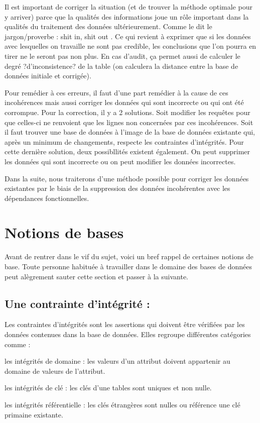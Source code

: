 \documentclass[12pt, a4paper, oneside, titlepage]{book}%
\begin{document}
Il est important de corriger la situation (et de trouver la méthode optimale pour y arriver) parce que la qualités des informations joue un rôle important dans la qualités du traitement des données ultérieurement. Comme le dit le jargon/proverbe : \og shit in, shit out \fg. Ce qui revient à exprimer que si les données avec lesquelles on travaille ne sont pas credible, les conclusions que l'on pourra en tirer ne le seront pas non plus. En cas d'audit, ça permet aussi de calculer le degré ?d'inconsistence? de la table (on calculera la distance entre la base de données initiale et corrigée). 

Pour remédier à ces erreurs, il faut d'une part remédier à la cause de ces incohérences mais aussi corriger les données qui sont incorrecte ou qui ont été corrompue. Pour la correction, il y a 2 solutions. Soit modifier les requêtes pour que celles-ci ne renvoient que les lignes non concernées par ces incohérences. Soit il faut trouver une base de données à l’image de la base de données existante qui, après un minimum de changements, respecte les contraintes d’intégrités. Pour cette dernière solution, deux possibllités existent également. On peut supprimer les données qui sont incorrecte ou on peut modifier les données incorrectes.

Dans la suite, nous traiterons d'une méthode possible pour corriger les données existantes par le biais de la suppression des données incohérentes avec les dépendances fonctionnelles.



\clearpage

\section{Notions de bases}\label{SECbase}
Avant de rentrer dans le vif du sujet, voici un bref rappel de certaines notions de base. Toute personne habituée à travailler dans le domaine des bases de données peut alègrement sauter cette section et passer à la suivante.


\subsection{Une contrainte d'intégrité : } 
Les contraintes d'intégrités sont les assertions qui doivent être vérifiées par les données contenues dans la base de données. Elles regroupe différentes catégories comme : 
\begin{description}
\item {les intégrités de domaine :} les valeurs d'un attribut doivent appartenir au domaine de valeurs de l'attribut.
\item {les intégrités de clé :} les clés d'une tables sont uniques et non nulle.
\item {les intégrités référentielle :} les clés étrangères sont nulles ou référence une clé primaine existante.
\end{description}
\end{document}
